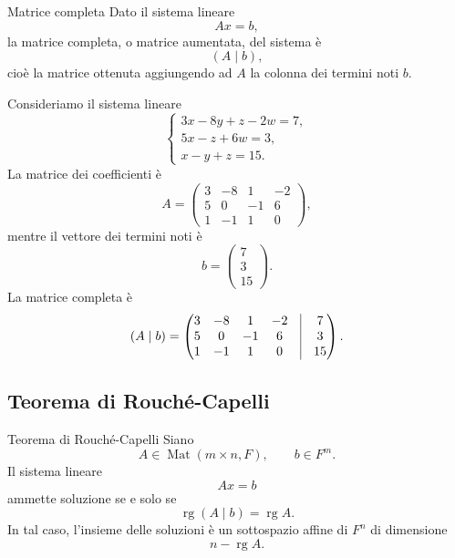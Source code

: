 \documentclass[a4paper]{article}
\begin{document}
\begin{snippetdefinition}{Matrice completa}
    Dato il sistema lineare
    \[
        Ax=b,
    \]
    la matrice completa, o matrice aumentata, del sistema è
    \[
        (A\mid b),
    \]
    cioè la matrice ottenuta aggiungendo ad \(A\) la colonna dei termini noti \(b\).
\end{snippetdefinition}

\begin{snippetexample}{}
    Consideriamo il sistema lineare
    \[
        \begin{cases}
            3x-8y+z-2w=7,\\
            5x-z+6w=3,\\
            x-y+z=15.
        \end{cases}
    \]
    La matrice dei coefficienti è
    \[
        A=
        \begin{pmatrix}
            3 & -8 & 1 & -2\\
            5 & 0 & -1 & 6\\
            1 & -1 & 1 & 0
        \end{pmatrix},
    \]
    mentre il vettore dei termini noti è
    \[
        b=
        \begin{pmatrix}
            7\\
            3\\
            15
        \end{pmatrix}.
    \]
    La matrice completa è
    \[
        (A\mid b)
        =
        \begin{pmatrix}
            3 & -8 & 1 & -2 & \vline & 7\\
            5 & 0 & -1 & 6 & \vline & 3\\
            1 & -1 & 1 & 0 & \vline & 15
        \end{pmatrix}.
    \]
\end{snippetexample}

\subsection{Teorema di Rouché-Capelli}

\begin{snippettheorem}{Teorema di Rouché-Capelli}
    Siano
    \[
        A\in\operatorname{Mat}(m\times n,F),
        \qquad
        b\in F^m.
    \]
    Il sistema lineare
    \[
        Ax=b
    \]
    ammette soluzione se e solo se
    \[
        \operatorname{rg}(A\mid b)=\operatorname{rg}A.
    \]
    In tal caso, l'insieme delle soluzioni è un sottospazio affine di \(F^n\) di dimensione
    \[
        n-\operatorname{rg}A.
    \]
\end{snippettheorem}
\end{document}
